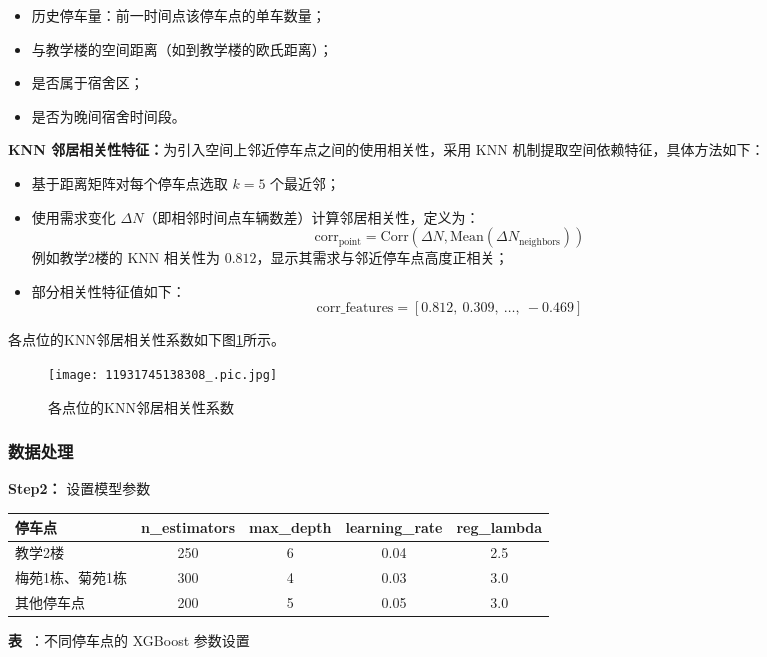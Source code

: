 \documentclass[withoutpreface,bwprint]{cumcmthesis}
\begin{document}
\begin{itemize}
    \item 历史停车量：前一时间点该停车点的单车数量；
    \item 与教学楼的空间距离（如到教学楼的欧氏距离）；
    \item 是否属于宿舍区；
    \item 是否为晚间宿舍时间段。
\end{itemize}

\textbf{KNN 邻居相关性特征：}为引入空间上邻近停车点之间的使用相关性，采用 KNN 机制提取空间依赖特征，具体方法如下：

\begin{itemize}
    \item 基于距离矩阵对每个停车点选取 $k=5$ 个最近邻；
    \item 使用需求变化 $\Delta N$（即相邻时间点车辆数差）计算邻居相关性，定义为：
    \[
    \text{corr}_{\text{point}} = \text{Corr}(\Delta N, \text{Mean}(\Delta N_{\text{neighbors}}))
    \]
    例如教学2楼的 KNN 相关性为 $0.812$，显示其需求与邻近停车点高度正相关；
    \item 部分相关性特征值如下：
    \[
    \text{corr\_features} = [0.812,\ 0.309,\ \ldots,\ -0.469]
    \]
\end{itemize}
各点位的KNN邻居相关性系数如下图\ref{fig:各点位的KNN邻居相关性系数}所示。
\begin{figure}[htbp]
  \centering
  \texttt{[image: 11931745138308\_.pic.jpg]} %
  \caption{各点位的KNN邻居相关性系数} 
  \label{fig:各点位的KNN邻居相关性系数}
\end{figure}
\subsubsection{数据处理}


\textbf{Step2：} 设置模型参数

\begin{table}[H]
\centering
\begin{tabularx}{\textwidth}{l C C C C}
\toprule
\textbf{停车点} & \textbf{n\_estimators} & \textbf{max\_depth} & \textbf{learning\_rate} & \textbf{reg\_lambda} \\
\midrule
教学2楼 & 250 & 6 & 0.04 & 2.5 \\
梅苑1栋、菊苑1栋 & 300 & 4 & 0.03 & 3.0 \\
其他停车点 & 200 & 5 & 0.05 & 3.0 \\
\bottomrule
\end{tabularx}

\vspace{5pt}
{\small \textbf{表~\thetable}：不同停车点的 XGBoost 参数设置}
\label{tab:xgb_params}
\end{table}
\end{document}

